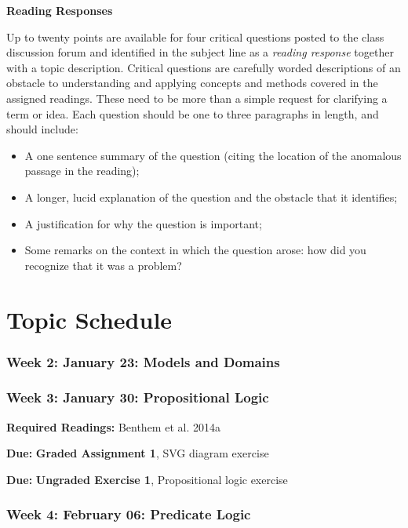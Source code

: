\documentclass[]{article}
\providecommand{\tightlist}{%
  \setlength{\itemsep}{0pt}\setlength{\parskip}{0pt}}
\begin{document}
\textbf{Reading Responses}

Up to twenty points are available for four critical questions posted to
the class discussion forum and identified in the subject line as a
\emph{reading response} together with a topic description. Critical
questions are carefully worded descriptions of an obstacle to
understanding and applying concepts and methods covered in the assigned
readings. These need to be more than a simple request for clarifying a
term or idea. Each question should be one to three paragraphs in length,
and should include:

\begin{itemize}
\tightlist
\item
  A one sentence summary of the question (citing the location of the
  anomalous passage in the reading);
\item
  A longer, lucid explanation of the question and the obstacle that it
  identifies;
\item
  A justification for why the question is important;
\item
  Some remarks on the context in which the question arose: how did you
  recognize that it was a problem?
\end{itemize}

\section{Topic Schedule}\label{topic-schedule}

\subsubsection{Week 2: January 23: Models and
Domains}\label{week-2-january-23-models-and-domains}

\subsubsection{Week 3: January 30: Propositional
Logic}\label{week-3-january-30-propositional-logic}

\textbf{Required Readings:} Benthem et al. 2014a

\textbf{Due:} \textbf{Graded Assignment 1}, SVG diagram exercise

\textbf{Due:} \textbf{Ungraded Exercise 1}, Propositional logic exercise

\subsubsection{Week 4: February 06: Predicate
Logic}\label{week-4-february-06-predicate-logic}
\end{document}
